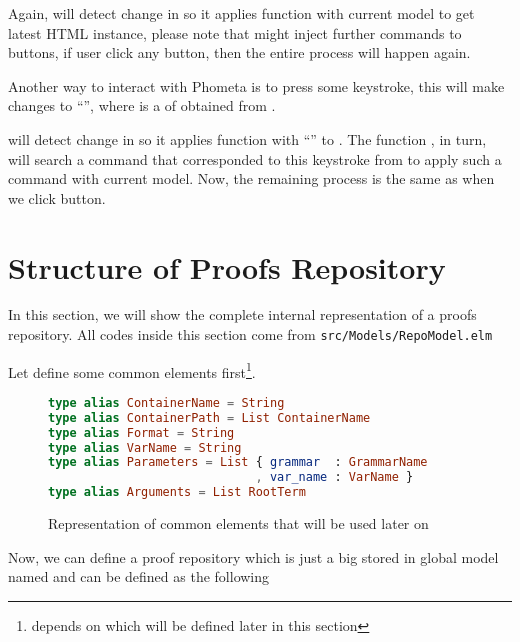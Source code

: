 \documentclass[master.tex]{subfiles}
\begin{document}
Again,  will detect change in  so it
applies function  with current model to get latest HTML instance,
please note that  might inject further commands to buttons, if
user click any button, then the entire process will happen again.

Another way to interact with Phometa is to press some keystroke, this will make
 changes to ``'', where
 is a  of  obtained from
.

 will detect change in  so it applies
function  with ``'' to
. The function , in turn, will search a
command that corresponded to this keystroke from  to
apply such a command with current model. Now, the remaining process is the same
as when we click button.

\section{Structure of Proofs Repository}
In this section, we will show the complete internal representation of a proofs
repository. All codes inside this section come from
\texttt{src/Models/RepoModel.elm}

Let define some common elements first\footnote{ depends on
   which will be defined later in this section}.

\begin{figure}[H]
\begin{framed}
\begin{lstlisting}[language=elm]
type alias ContainerName = String
type alias ContainerPath = List ContainerName
type alias Format = String
type alias VarName = String
type alias Parameters = List { grammar  : GrammarName
                             , var_name : VarName }
type alias Arguments = List RootTerm
\end{lstlisting}
\end{framed}
\caption{Representation of common elements that will be used later on}
\label{fig:implementation-repo-common}
\end{figure}

Now, we can define a proof repository which is just a big  stored
in global model named  and can be defined as the
following
\end{document}
